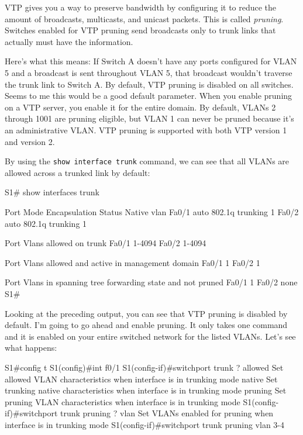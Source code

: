 VTP gives you a way to preserve bandwidth by configuring it to reduce
the amount of broadcasts, multicasts, and unicast packets. This is
called \emph{pruning}. Switches enabled for VTP pruning send broadcasts
only to trunk links that actually must have the information.

Here's what this means: If Switch A doesn't have any ports configured
for VLAN 5 and a broadcast is sent throughout VLAN 5, that broadcast
wouldn't traverse the trunk link to Switch A. By default, VTP pruning is
disabled on all switches. Seems to me this would be a good default
parameter. When you enable pruning on a VTP server, you enable it for
the entire domain. By default, VLANs 2 through 1001 are pruning
eligible, but VLAN 1 can never be pruned because it's an administrative
VLAN. VTP pruning is supported with both VTP version 1 and version 2.

By using the \texttt{show\ interface\ trunk} command, we can see that
all VLANs are allowed across a trunked link by default:

\begin{cli}
S1# show interfaces trunk

Port        Mode         Encapsulation  Status        Native vlan
Fa0/1       auto         802.1q         trunking      1
Fa0/2       auto         802.1q         trunking      1

Port        Vlans allowed on trunk
Fa0/1       1-4094
Fa0/2       1-4094

Port        Vlans allowed and active in management domain
Fa0/1       1
Fa0/2       1

Port        Vlans in spanning tree forwarding state and not pruned
Fa0/1       1
Fa0/2       none
S1#
\end{cli}

Looking at the preceding output, you can see that VTP pruning is
disabled by default. I'm going to go ahead and enable pruning. It only
takes one command and it is enabled on your entire switched network for
the listed VLANs. Let's see what happens:

\begin{cli}
S1#config t
S1(config)#int f0/1
S1(config-if)#switchport trunk ?
  allowed  Set allowed VLAN characteristics when interface is
  in trunking mode
  native   Set trunking native characteristics when interface
  is in trunking mode
  pruning  Set pruning VLAN characteristics when interface is
  in trunking mode
S1(config-if)#switchport trunk pruning ?
  vlan  Set VLANs enabled for pruning when interface is in
  trunking mode
S1(config-if)#switchport trunk pruning vlan 3-4
\end{cli}

